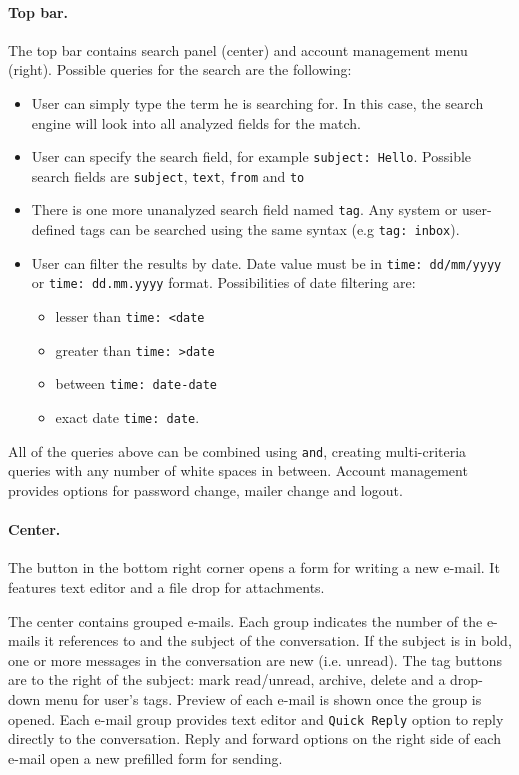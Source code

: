\paragraph{Top bar.}
The top bar contains search panel (center) and account management menu (right). Possible queries for the search are the following:
\begin{itemize}
\item User can simply type the term he is searching for. In this case, the search engine will look into all analyzed fields for the match.
\item User can specify the search field, for example \texttt{subject: Hello}. Possible search fields are \texttt{subject}, \texttt{text}, \texttt{from} and \texttt{to}
\item There is one more unanalyzed search field named \texttt{tag}. Any system or user-defined tags can be searched using the same syntax (e.g \texttt{tag: inbox}).
\item User can filter the results by date. Date value must be in \texttt{time: dd/mm/yyyy} or \texttt{time: dd.mm.yyyy} format. Possibilities of date filtering are:
\begin{itemize}
\item lesser than \texttt{time: <date}
\item greater than \texttt{time: >date}
\item between \texttt{time: date-date}
\item exact date \texttt{time: date}.
\end{itemize}
\end{itemize}
All of the queries above can be combined using \texttt{and}, creating multi-criteria queries with any number of white spaces in between.
Account management provides options for password change, mailer change and logout.

\paragraph{Center.}
The button in the bottom right corner opens a form for writing a new e-mail. It features text editor and a file drop for attachments.

The center contains grouped e-mails. Each group indicates the number of the e-mails it references to and the subject of the conversation. If the subject is in bold, one or more messages in the conversation are new (i.e. unread). The tag buttons are to the right of the subject: mark read/unread, archive, delete and a drop-down menu for user's tags.
Preview of each e-mail is shown once the group is opened. Each e-mail group provides text editor and \texttt{Quick Reply} option to reply directly to the conversation. Reply and forward options on the right side of each e-mail open a new prefilled form for sending.

